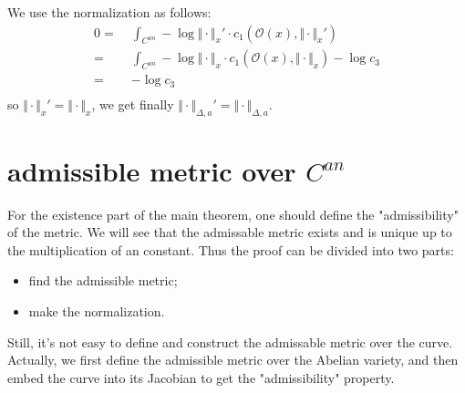 \documentclass[reqno,11pt]{amsart}
\numberwithin{equation}{section}
\theoremstyle{plain}
\theoremstyle{plain}
\numberwithin{equation}{section}
\theoremstyle{remark}
\newcommand{\norm}[1]{\Vert{#1}\Vert}
\begin{document}
We use the normalization as follows:
\begin{equation*}
\begin{aligned}
0  =\;& \int_{C^{an}}-\log \norm{\cdot}_x' \cdot c_1(\mathcal{O}(x),\norm{\cdot}_x')\\ 
  =\;& \int_{C^{an}}-\log \norm{\cdot}_x \cdot c_1(\mathcal{O}(x),\norm{\cdot}_x) -\log c_3 \\ 
  =\;&  -\log c_3 \\ 
\end{aligned}
\end{equation*}
so $\norm{\cdot}_x'=\norm{\cdot}_x$, we get finally $\norm{\cdot}_{\Delta,a}'=\norm{\cdot}_{\Delta,a}$.

\section{admissible metric over $C^{an}$}\label{sec:existence}

For the existence part of the main theorem, one should define the "admissibility" of the metric. We will see that the admissable metric exists and is unique up to the multiplication of an constant. Thus the proof can be divided into two parts:
\begin{itemize}
\item find the admissible metric;
\item make the normalization.
\end{itemize}
Still, it's not easy to define and construct the admissable metric over the curve. Actually, we first define the admissible metric over the Abelian variety, and then embed the curve into its Jacobian to get the "admissibility" property.
\end{document}
